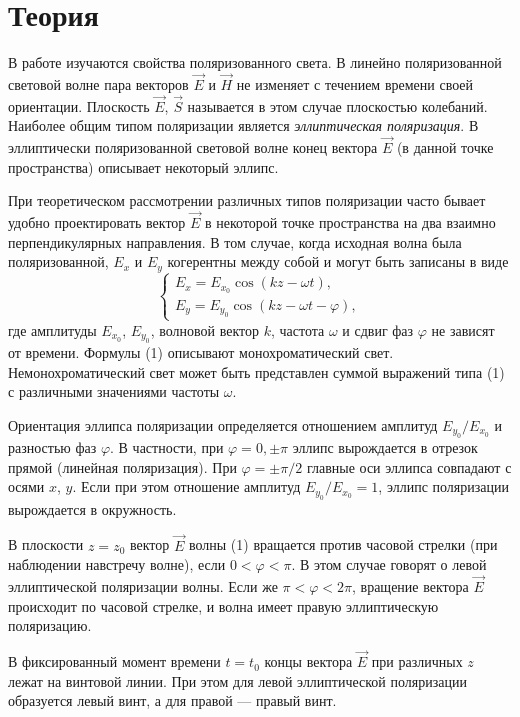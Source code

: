 \section*{Теория}

В работе изучаются свойства поляризованного света. В линейно поляризованной световой волне пара векторов $\vec{E}$ и $\vec{H}$ не изменяет с течением времени своей ориентации. Плоскость $\vec{E}$, $\vec{S}$ называется в этом случае плоскостью колебаний. Наиболее общим типом поляризации является \textit{эллиптическая поляризация}. В эллиптически поляризованной световой волне конец вектора $\vec{E}$ (в данной точке пространства) описывает некоторый эллипс.

При теоретическом рассмотрении различных типов поляризации часто бывает удобно проектировать вектор $\vec{E}$ в некоторой точке пространства на два взаимно перпендикулярных направления. В том случае, когда исходная волна была поляризованной, $E_x$ и $E_y$ когерентны между собой и могут быть записаны в виде
\begin{equation}
	\begin{cases}
		E_x = E_{x_0}\cos(kz - \omega t),\\
		E_y = E_{y_0}\cos(kz - \omega t-\varphi),
	\end{cases}
\end{equation}
где амплитуды $E_{x_0}$, $E_{y_0}$, волновой вектор $k$, частота $\omega$ и сдвиг фаз $\varphi$ не зависят от времени. Формулы (1) описывают монохроматический свет. Немонохроматический свет может быть представлен суммой выражений типа (1) с различными значениями частоты $\omega$.

Ориентация эллипса поляризации определяется отношением амплитуд $E_{y_0}/E_{x_0}$ и разностью фаз $\varphi$. В частности, при $\varphi = 0, \pm\pi$ эллипс вырождается в отрезок прямой (линейная поляризация). При $\varphi = \pm\pi/2$ главные оси эллипса совпадают с осями $x$, $y$. Если при этом отношение амплитуд $E_{y_0}/E_{x_0} = 1$, эллипс поляризации вырождается в окружность.	

В плоскости $z = z_0$ вектор $\vec{E}$ волны (1) вращается против часовой стрелки (при наблюдении навстречу волне), если $0 < \varphi < \pi$. В этом случае говорят о левой эллиптической поляризации волны. Если же
$\pi < \varphi < 2\pi$, вращение вектора $\vec{E}$ происходит по часовой стрелке, и волна имеет правую эллиптическую поляризацию.


В фиксированный момент времени $t = t_0$ концы вектора $\vec{E}$ при различных $z$ лежат на винтовой линии. При этом для левой эллиптической поляризации образуется левый винт, а для правой --- правый винт. \\


